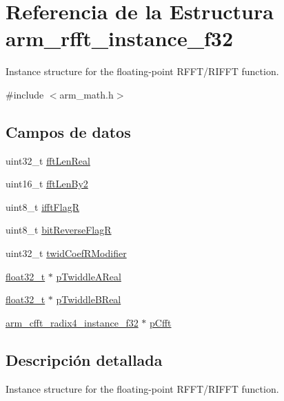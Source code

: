 \hypertarget{structarm__rfft__instance__f32}{}\section{Referencia de la Estructura arm\+\_\+rfft\+\_\+instance\+\_\+f32}
\label{structarm__rfft__instance__f32}


Instance structure for the floating-\/point R\+F\+F\+T/\+R\+I\+F\+FT function.  




{\ttfamily \#include $<$arm\+\_\+math.\+h$>$}

\subsection*{Campos de datos}
\begin{DoxyCompactItemize}
\item 
uint32\+\_\+t \hyperlink{structarm__rfft__instance__f32_adf0d4604cf5546075d9d4cf122d6c986}{fft\+Len\+Real}
\item 
uint16\+\_\+t \hyperlink{structarm__rfft__instance__f32_a206b7cd92c35fde3432e5b9a0650c42c}{fft\+Len\+By2}
\item 
uint8\+\_\+t \hyperlink{structarm__rfft__instance__f32_a787d72055c89e4d62b188d6bd646341c}{ifft\+FlagR}
\item 
uint8\+\_\+t \hyperlink{structarm__rfft__instance__f32_ad56ec2425e2422108b8767b43d944591}{bit\+Reverse\+FlagR}
\item 
uint32\+\_\+t \hyperlink{structarm__rfft__instance__f32_a5b06f7f76c018db993fe6acc5708c589}{twid\+Coef\+R\+Modifier}
\item 
\hyperlink{arm__math_8h_a4611b605e45ab401f02cab15c5e38715}{float32\+\_\+t} $\ast$ \hyperlink{structarm__rfft__instance__f32_a1fb731395d060f9999c91c242b3e8a61}{p\+Twiddle\+A\+Real}
\item 
\hyperlink{arm__math_8h_a4611b605e45ab401f02cab15c5e38715}{float32\+\_\+t} $\ast$ \hyperlink{structarm__rfft__instance__f32_ab13a458744ac79bb23784351e8002382}{p\+Twiddle\+B\+Real}
\item 
\hyperlink{structarm__cfft__radix4__instance__f32}{arm\+\_\+cfft\+\_\+radix4\+\_\+instance\+\_\+f32} $\ast$ \hyperlink{structarm__rfft__instance__f32_ab7bd4d374a1780dea50efd3e7ac220be}{p\+Cfft}
\end{DoxyCompactItemize}


\subsection{Descripción detallada}
Instance structure for the floating-\/point R\+F\+F\+T/\+R\+I\+F\+FT function. 

